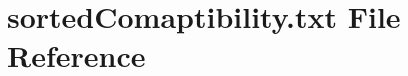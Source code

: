 \hypertarget{sortedComaptibility_8txt}{}\section{sorted\+Comaptibility.\+txt File Reference}
\label{sortedComaptibility_8txt}
